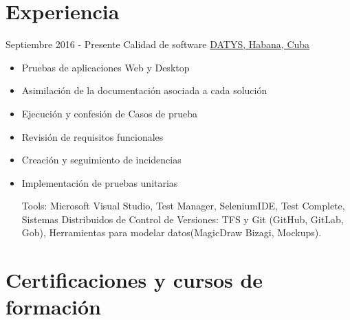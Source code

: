 \documentclass[letterpaper]{twentysecondcv} %
\begin{document}
\makeprofile %
 

\section{Experiencia}

\begin{twenty} %
\twentyitem
    	{Septiembre 2016 -}
		{Presente}
        {Calidad de software}
        {\href{http://datys.cu/}{DATYS, Habana, Cuba}}
        {}
        {\begin{itemize}
        \item Pruebas de aplicaciones Web y Desktop
        \item Asimilación de la documentación asociada a cada solución
        \item Ejecución y confesión de Casos de prueba
        \item Revisión de requisitos funcionales 
        \item Creación y seguimiento de incidencias
        \item Implementación de pruebas unitarias 

        
        Tools: Microsoft Visual Studio, Test Manager, SeleniumIDE, Test Complete, Sistemas Distribuidos de Control de Versiones: TFS y Git (GitHub, GitLab, Gob), Herramientas para modelar datos(MagicDraw
Bizagi, Mockups).
        
        \end{itemize}}
  
        
\end{twenty}

\section{Certificaciones y cursos de formación}
\end{document}
